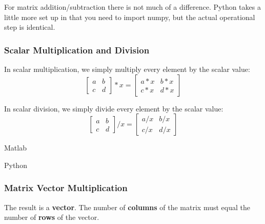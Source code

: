 For matrix addition/subtraction there is not much of a difference.  Python takes a little more set up in that you need to import numpy, but the actual operational step is identical.

\subsubsection{Scalar Multiplication and Division}
In scalar multiplication, we simply multiply every element by the scalar value:
\begin{equation}
  \left[
    \begin{matrix}
      a & b \\
      c & d
    \end{matrix}
    \right] * x =
  \left[
    \begin{matrix}
      a*x & b*x \\
      c*x & d*x
    \end{matrix}
    \right]
  \label{eqn:MatrixScalarMultiplication}
\end{equation}

In scalar division, we simply divide every element by the scalar value:
\begin{equation}
  \left[
    \begin{matrix}
      a & b \\
      c & d
    \end{matrix}
    \right] / x =
  \left[
    \begin{matrix}
      a/x & b/x \\
      c/x & d/x
    \end{matrix}
    \right]
  \label{eqn:MatrixScalarMultiplication}
\end{equation}

\begin{multicols}{2}
  Matlab\\
  \columnbreak

  Python\\
  
\end{multicols}

\subsubsection{Matrix Vector Multiplication}
The result is a \textbf{vector}. The number of \textbf{columns} of the matrix must equal the number of \textbf{rows} of the vector.\\

